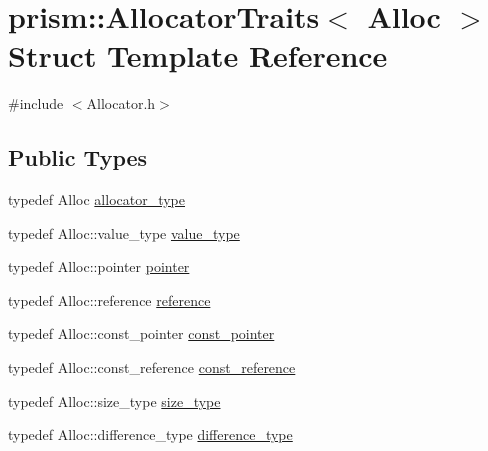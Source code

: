 \hypertarget{structprism_1_1_allocator_traits}{}\section{prism\+:\+:Allocator\+Traits$<$ Alloc $>$ Struct Template Reference}
\label{structprism_1_1_allocator_traits}


{\ttfamily \#include $<$Allocator.\+h$>$}

\subsection*{Public Types}
\begin{DoxyCompactItemize}
\item 
typedef Alloc \hyperlink{structprism_1_1_allocator_traits_a6d687c073652db923f1808e67f550fcd}{allocator\+\_\+type}
\item 
typedef Alloc\+::value\+\_\+type \hyperlink{structprism_1_1_allocator_traits_a02838686d063e89d7c497fef69592265}{value\+\_\+type}
\item 
typedef Alloc\+::pointer \hyperlink{structprism_1_1_allocator_traits_aed8a12c05f82e96f45db30e9511fa62d}{pointer}
\item 
typedef Alloc\+::reference \hyperlink{structprism_1_1_allocator_traits_aa134d981ab397b1bb691af2da23b1ad6}{reference}
\item 
typedef Alloc\+::const\+\_\+pointer \hyperlink{structprism_1_1_allocator_traits_ae9bcf74e2770e54eb99f29edfce5f81e}{const\+\_\+pointer}
\item 
typedef Alloc\+::const\+\_\+reference \hyperlink{structprism_1_1_allocator_traits_a5054d2fa3ac8a0a1d6d1885143107963}{const\+\_\+reference}
\item 
typedef Alloc\+::size\+\_\+type \hyperlink{structprism_1_1_allocator_traits_a7cf55823ae63bccb9cf50b1e08619363}{size\+\_\+type}
\item 
typedef Alloc\+::difference\+\_\+type \hyperlink{structprism_1_1_allocator_traits_a8cb6d0ad1c318af0984ce70b71b4f459}{difference\+\_\+type}
\end{DoxyCompactItemize}
